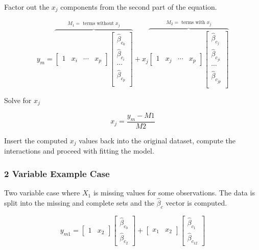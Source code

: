 \documentclass[../../paper.tex]{subfiles}
\begin{document}
Factor out the $x_{j}$ components from the second part of the equation.

\begin{equation}
  y_{m} =
  \overbrace{
  \begin{bmatrix}
    1 & x_{i} & \cdots & x_{p}
  \end{bmatrix}
  \begin{bmatrix}
    \hat{\beta}_{c_0} \\
    \hat{\beta}_{c_i} \\
    \cdots \\
    \hat{\beta}_{c_p} \\
  \end{bmatrix}}^{M_{1} = \text{ terms without } x_{j}} +
  x_{j}
  \overbrace{
  \begin{bmatrix}
    1 & x_{j} & \cdots & x_{p}
  \end{bmatrix}
  \begin{bmatrix}
    \hat{\beta}_{c_{j}} \\
    \hat{\beta}_{c_{ji}} \\
    \cdots \\
    \hat{\beta}_{c_{jp}} \\
  \end{bmatrix}}^{M_{2} = \text{ terms with } x_{j}}
\end{equation}

Solve for $x_{j}$

\begin{equation}
x_{j} = \frac{y_{m} - M1}{M2}
\end{equation}

Insert the computed $x_{j}$ values back into the original dataset, compute the interactions and proceed with fitting the model.

\subsubsection*{2 Variable Example Case}
Two variable case where $X_{1}$ is missing values for some observations. The data
is split into the missing and complete sets and the $\hat{\beta}_{c}$ vector is
computed.

\begin{equation}
  y_{m1} =
  \begin{bmatrix}
    1 & x_{2}
  \end{bmatrix}
  \begin{bmatrix}
    \hat{\beta}_{c_0} \\
    \hat{\beta}_{c_2}
  \end{bmatrix} +
  \begin{bmatrix}
    x_{1} & x_{2}
  \end{bmatrix}
  \begin{bmatrix}
    \hat{\beta}_{c_1} \\
    \hat{\beta}_{c_{12}}
  \end{bmatrix}
\end{equation}
\end{document}
